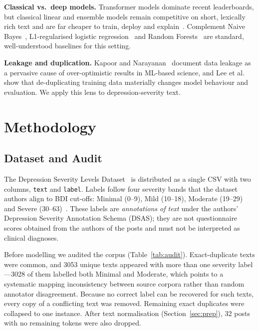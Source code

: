 \documentclass[conference]{IEEEtran}
\begin{document}
\textbf{Classical vs.\ deep models.} Transformer models dominate recent leaderboards, but classical linear and ensemble models remain competitive on short, lexically rich text and are far cheaper to train, deploy and explain~\cite{guntuku2017detecting}. Complement Naive Bayes~\cite{rennie2003tackling}, L1-regularised logistic regression~\cite{tibshirani1996lasso,zou2005elasticnet} and Random Forests~\cite{breiman2001rf} are standard, well-understood baselines for this setting.

\textbf{Leakage and duplication.} Kapoor and Narayanan~\cite{kapoor2023leakage} document data leakage as a pervasive cause of over-optimistic results in ML-based science, and Lee et al.~\cite{lee2022dedup} show that de-duplicating training data materially changes model behaviour and evaluation. We apply this lens to depression-severity text.

\section{Methodology}

\subsection{Dataset and Audit}

The Depression Severity Levels Dataset~\cite{kuas2023dataset} is distributed as a single CSV with two columns, \texttt{text} and \texttt{label}. Labels follow four severity bands that the dataset authors align to BDI cut-offs: Minimal (0--9), Mild (10--18), Moderate (19--29) and Severe (30--63)~\cite{beck1988psychometric}. These labels are \emph{annotations of text} under the authors' Depression Severity Annotation Schema (DSAS); they are not questionnaire scores obtained from the authors of the posts and must not be interpreted as clinical diagnoses.

Before modelling we audited the corpus (Table~\ref{tab:audit}). Exact-duplicate texts were common, and \num{3053} unique texts appeared with more than one severity label---\num{3028} of them labelled both Minimal and Moderate, which points to a systematic mapping inconsistency between source corpora rather than random annotator disagreement. Because no correct label can be recovered for such texts, every copy of a conflicting text was removed. Remaining exact duplicates were collapsed to one instance. After text normalisation (Section~\ref{sec:prep}), 32 posts with no remaining tokens were also dropped.
\end{document}
